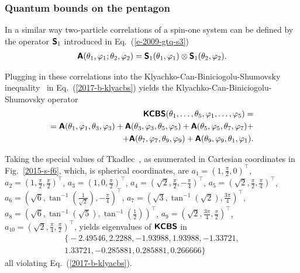 \subsubsection{Quantum bounds on the pentagon}


In a similar way  two-particle correlations of a spin-one system can be defined by the operator $\textsf{\textbf{S}}_1$
introduced in Eq.~(\ref{e-2009-gtq-s3})
\begin{equation}
\begin{split}
\textsf{\textbf{A}} (\theta_1 ,\varphi_1;\theta_2 ,\varphi_2)
=
\textsf{\textbf{S}}_1 (\theta_1 ,\varphi_1) \otimes
\textsf{\textbf{S}}_1 (\theta_2 ,\varphi_2)
.
\end{split}
\label{e-2017-b-whatever-e6}
\end{equation}

Plugging in these correlations into the Klyachko-Can-Biniciogolu-Shumovsky inequality~\cite{Klyachko-2008} in Eq.~(\ref{2017-b-klyacbs})
yields  the Klyachko-Can-Biniciogolu-Shumovsky operator
\begin{equation}
\begin{split}
\textsf{\textbf{KCBS}}( \theta_1, \ldots , \theta_5 ,\varphi_1, \ldots ,\varphi_5)=\\=
\textsf{\textbf{A}}( \theta_1,\varphi_1, \theta_3,\varphi_3) +
\textsf{\textbf{A}} ( \theta_3,\varphi_3, \theta_5,\varphi_5) +
\textsf{\textbf{A}} ( \theta_5,\varphi_5, \theta_7,\varphi_7 ) +   \\
+\textsf{\textbf{A}} ( \theta_7,\varphi_7, \theta_9,\varphi_9)  +
\textsf{\textbf{A}} ( \theta_9,\varphi_9, \theta_1,\varphi_1)
.
\end{split}
\label{e-2017-b-whatever-e7}
\end{equation}

Taking the special values of Tkadlec~\cite{tkadlec-priv-1995},
as enumerated in Cartesian coordinates in Fig.~\ref{2015-s-f6}, which, is spherical coordinates, are
$a_{1} = \left(   1 , \frac{\pi }{2} , 0  \right)^\intercal$,
$a_{2} = \left(   1 , \frac{\pi }{2} , \frac{\pi }{2}  \right)^\intercal$,
$a_{3} = \left(   1 , 0 , \frac{\pi }{2}  \right)^\intercal$,
$a_{4} = \left(   \sqrt{2} , \frac{\pi }{2} , -\frac{\pi }{4}  \right)^\intercal$,
$a_{5} = \left(   \sqrt{2} , \frac{\pi }{2} , \frac{\pi }{4}  \right)^\intercal$,
$a_{6} = \left(   \sqrt{6} , \tan ^{-1}\left(\frac{1}{\sqrt{2}}\right) , -\frac{\pi }{4}  \right)^\intercal$,
$a_{7} = \left(   \sqrt{3} , \tan ^{-1}\left(\sqrt{2}\right) , \frac{3 \pi }{4}  \right)^\intercal$,
$a_{8} = \left(   \sqrt{6} , \tan ^{-1}\left(\sqrt{5}\right) , \tan ^{-1}\left(\frac{1}{2}\right)  \right)^\intercal$,
$a_{9} = \left(   \sqrt{2} , \frac{3 \pi }{4} , \frac{\pi }{2}  \right)^\intercal$,
$a_{10} = \left(  \sqrt{2} , \frac{\pi }{4} , \frac{\pi }{2}  \right)^\intercal$,
 yields  eigenvalues of $\textsf{\textbf{KCBS}}$ in
\begin{equation}
\begin{split}
\big\{-2.49546, 2.2288, -1.93988, 1.93988, -1.33721, \\
1.33721, -0.285881, 0.285881, 0.266666\big\}
\end{split}
\label{e-2017-b-whatever-e7kcbs}
\end{equation}
all violating Eq.~(\ref{2017-b-klyacbs}).


